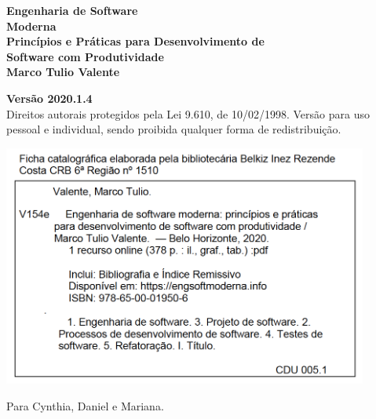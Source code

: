 \thispagestyle{empty}



\newpage
\thispagestyle{empty}
\vspace*{4cm}
\begin{center}
{\Huge \bf  Engenharia de Software\\[.3cm] Moderna}\\ 
\vspace*{1cm}
{\Large \bf  Princípios e Práticas para Desenvolvimento de\\[.3cm] Software com Produtividade}\\ 
\vspace*{3cm}
{\Large \bf Marco Tulio Valente}
\end{center}
\newpage

\newpage
\thispagestyle{empty}
\vspace*{3cm}
\begin{center}
{\Large \bf  Versão 2020.1.4}\\ 
\vspace*{1cm}
{\large Direitos autorais protegidos pela Lei 9.610, de 10/02/1998. Versão para  uso pessoal e individual, sendo proibida qualquer forma de redistribuição.}
\end{center}

\vspace*{3cm}
\begin{center}
\includegraphics[width=12cm]{figs/capa/ficha-catalografica.png}
\end{center}

\newpage

\newpage
\thispagestyle{empty}
\vspace*{5cm}
\begin{center}
\large Para Cynthia, Daniel e Mariana.
\end{center}

\newpage
\newpage

\tableofcontents
